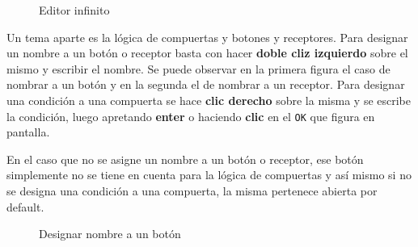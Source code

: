 \documentclass[a4paper]{article}
\begin{document}
\begin{figure}[!h]
	\caption{Editor infinito}
	\label{fig:diagrama20}
\end{figure}

\newpage

Un tema aparte es la lógica de compuertas y botones y receptores. Para designar un nombre a un botón o receptor basta con hacer \textbf{doble cliz izquierdo} sobre el mismo y escribir el nombre. Se puede observar en la primera figura el caso de nombrar a un botón y en la segunda el de nombrar a un receptor. Para designar una condición a una compuerta se hace \textbf{clic derecho} sobre la misma y se escribe la condición, luego apretando \textbf{enter} o haciendo \textbf{clic} en el \texttt{OK} que figura en pantalla.

En el caso que no se asigne un nombre a un botón o receptor, ese botón simplemente no se tiene en cuenta para la lógica de compuertas y así mismo si no se designa una condición a una compuerta, la misma pertenece abierta por default.

\begin{figure}[!h]
	\caption{Designar nombre a un botón}
	\label{fig:diagrama21}
\end{figure}
\end{document}
